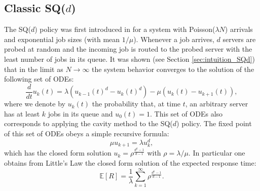 \documentclass[12pt]{report}
\newcommand{\E}{\mathbb{E}}
\begin{document}

\subsection{Classic SQ($d$)} \label{sec:SQd_explained}
The SQ($d$) policy was first introduced in \cite{mitzenmacher2, vvedenskaya3} for a system with
Poisson($\lambda N$) arrivals and exponential job sizes (with mean $1/\mu$). Whenever a job arrives, 
$d$ servers are probed at random and the incoming job is routed to the probed server with the least number of jobs in its queue. It was shown (see Section \ref{sec:intuition_SQd}) that in the limit as $N \rightarrow \infty$
the system behavior converges to the solution of the following set of ODEs:
$$
\frac{d}{dt} u_k(t)
=
\lambda (u_{k-1}(t)^d-u_k(t)^d) - \mu(u_k(t)-u_{k+1}(t)),
$$
where we denote by $u_k(t)$ the probability that, at time $t$, an arbitrary server has at least $k$ jobs in its queue and $u_0(t)=1$. This set of ODEs also corresponds to applying the cavity method to the SQ($d$) policy. The fixed point of this set of ODEs obeys a simple recursive formula:
\begin{equation}\label{eq:SQd_vanilla}
\mu u_{k+1}= \lambda u_k^d,
\end{equation}
which has the closed form solution $u_k = \rho^{\frac{d^k-1}{d-1}}$
with $\rho = \lambda/\mu$. In particular one obtains from Little's Law the closed form solution of the expected response time:
\begin{equation}\label{eq:ER_SQd_vanilla}
\E[R]= \frac{1}{\lambda} \sum_{k=1}^\infty \rho^{\frac{d^k-1}{d-1}}.
\end{equation}
\end{document}
